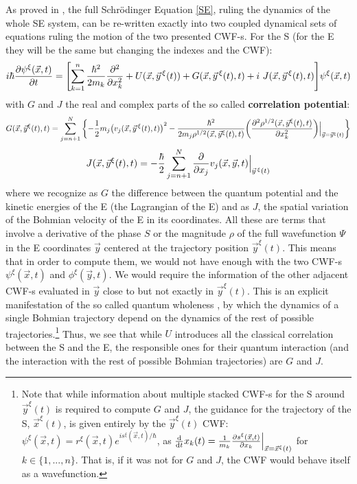 \documentclass[11pt, a4paper]{article} %
\begin{document}
As proved in \cite{GJ}, the full Schrödinger Equation \eqref{SE}, ruling the dynamics of the whole SE system, can be re-written exactly into two coupled dynamical sets of equations ruling the motion of the two presented CWF-s. For the S (for the E they will be the same but changing the indexes and the CWF):
\begin{equation}\label{SE.GJ}
i \hbar \pdv{\psi^\xi (\vec{x},t)}{t} = \qty[\sum_{k=1}^n\frac{\hbar^2}{2m_k} \pdv[2]{}{x_k} +  U(\vec{x}, \vec{y}^{\, \xi}(t)) + G(\vec{x}, \vec{y}^{\, \xi}(t),t)+i\ J(\vec{x}, \vec{y}^{\, \xi}(t),t)] \psi^\xi (\vec{x},t)
\end{equation}
with $G$ and $J$ the real and complex parts of the so called {\bf correlation potential}:
\begin{equation}\label{G.Bohm}
G(\vec{x},\vec{y}^\xi(t),t)=\sum_{j=n+1}^N\qty{-\frac{1}{2}m_j\qty(v_j(\vec{x},\vec{y}^{\, \xi}(t),t))^2-\frac{\hbar^2}{2m_j\rho^{1/2}(\vec{x},\vec{y}^\xi(t),t)}\qty(\pdv[2]{\rho^{1/2}(\vec{x},\vec{y}^\xi(t),t)}{x_k})\Big\rvert_{\vec{y}=\vec{y}^\xi(t)} }
\end{equation}
\begin{equation}\label{J.Bohm}
J(\vec{x},\vec{y}^\xi(t),t)=-\frac{\hbar}{2}\sum_{j=n+1}^N\pdv{}{x_j}v_j(\vec{x},\vec{y},t)\Big\rvert_{\vec{y}^{\, \xi}(t)}
\end{equation}
where we recognize as $G$ the difference between the quantum potential \cite{JordiXavier, Durr} and the kinetic energies of the E (the Lagrangian of the E) and as $J$, the spatial variation of the Bohmian velocity of the E in its coordinates. All these are terms that involve a derivative of the phase $S$ or the magnitude $\rho$ of the full wavefunction $\Psi$ in the E coordinates $\vec{y}$ centered at the trajectory position $\vec{y}^\xi(t)$. This means that in order to compute them, we would not have enough with the two CWF-s $\psi^\xi(\vec{x},t)$ and $\phi^\xi(\vec{y},t)$. We would require the information of the other adjacent CWF-s evaluated in $\vec{y}$ close to but not exactly in $\vec{y}^\xi(t)$. This is an explicit manifestation of the so called quantum wholeness \cite{JordiXavier}, by which the dynamics of a single Bohmian trajectory depend on the dynamics of the rest of possible trajectories.\footnote{Note that while information about multiple stacked CWF-s for the S around $\vec{y}^\xi(t)$ is required to compute $G$ and $J$, the guidance for the trajectory of the S, $\vec{x}^\xi(t)$, is given entirely by the $\vec{y}^\xi(t)$ CWF: $\psi^\xi (\vec{x},t)=r^\xi(\vec{x},t)e^{is^\xi(\vec{x},t)/\hbar}$, as $\dv{}{t}x_k(t)=\frac{1}{m_k}\pdv{s^\xi(\vec{x},t)}{x_k}\Big\rvert_{\vec{x}=\vec{x}^\xi(t)}$ for $k\in\{1,...,n\}$. That is, if it was not for $G$ and $J$, the CWF would behave itself as a wavefunction.} Thus, we see that while $U$ introduces all the classical correlation between the S and the E, the responsible ones for their quantum interaction (and the interaction with the rest of possible Bohmian trajectories) are $G$ and $J$.
\end{document}
